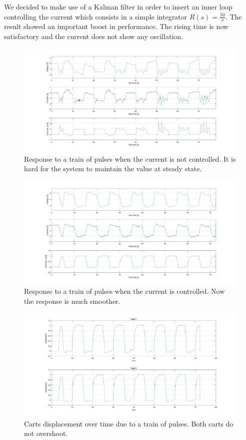 We decided to make use of a Kalman filter in order to insert an inner loop controlling the current which consists in a simple integrator $R(s)=\frac{50}{s}$. The result showed an important boost in performance. The rising time is now satisfactory and the current does not show any oscillation.\\

\begin{figure}[h]
	\setlength{\abovecaptionskip}{-10pt}
	\setlength{\belowcaptionskip}{-10pt}
	\centering
	\includegraphics[width=0.7\linewidth]{img/hinf_nocurr}
	\caption{Response to a train of pulses when the current is not controlled. It is hard for the system to maintain the value at steady state.}
	\label{fig:hinfnocurr}
\end{figure}

\begin{figure}[h]
	\setlength{\abovecaptionskip}{-10pt}
	\setlength{\belowcaptionskip}{-10pt}	
	\centering
	\includegraphics[width=0.7\linewidth]{img/hinf_curr}
	\caption{Response to a train of pulses when the current is controlled. Now the response is much smoother.}
	\label{fig:hinfnocurr}
\end{figure}

\begin{figure}[h]
	\setlength{\abovecaptionskip}{-10pt}
	\setlength{\belowcaptionskip}{-10pt}
	\centering
	\includegraphics[width=0.7\linewidth]{img/hinf_response}
	\caption{Carts displacement over time due to a train of pulses. Both carts do not overshoot.}
	\label{fig:2dofcarts}
\end{figure}